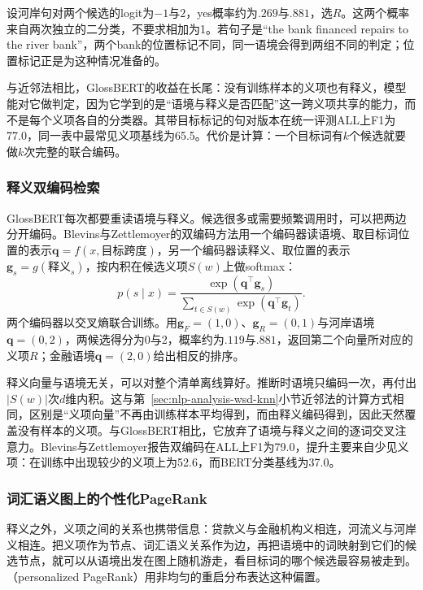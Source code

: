 设河岸句对两个候选的logit为$-1$与$2$，yes概率约为$.269$与$.881$，选$R$。这两个概率来自两次独立的二分类，不要求相加为1。若句子是“the bank financed repairs to the river bank”，两个bank的位置标记不同，同一语境会得到两组不同的判定；位置标记正是为这种情况准备的。

与近邻法相比，GlossBERT的收益在长尾：没有训练样本的义项也有释义，模型能对它做判定，因为它学到的是“语境与释义是否匹配”这一跨义项共享的能力，而不是每个义项各自的分类器。其带目标标记的句对版本在统一评测ALL上F1为77.0，同一表中最常见义项基线为65.5。代价是计算：一个目标词有$k$个候选就要做$k$次完整的联合编码。

\subsubsection{释义双编码检索}
\label{sec:nlp-analysis-gloss-retrieval}

GlossBERT每次都要重读语境与释义。候选很多或需要频繁调用时，可以把两边分开编码。Blevins与Zettlemoyer的双编码方法用一个编码器读语境、取目标词位置的表示$\bm q=f(x,\text{目标跨度})$，另一个编码器读释义、取\code{[CLS]}位置的表示$\bm g_s=g(\text{释义}_s)$，按内积在候选义项$S(w)$上做softmax\cite{blevins-zettlemoyer-2020-moving}：
\[
 p(s\mid x)=\frac{\exp(\bm q^{\top}\bm g_s)}
                  {\sum_{t\in S(w)}\exp(\bm q^{\top}\bm g_t)}.
\]
两个编码器以交叉熵联合训练。用$\bm g_F=(1,0)$、$\bm g_R=(0,1)$与河岸语境$\bm q=(0,2)$，两候选得分为0与2，概率约为$.119$与$.881$，返回第二个向量所对应的义项$R$；金融语境$\bm q=(2,0)$给出相反的排序。

释义向量与语境无关，可以对整个清单离线算好。推断时语境只编码一次，再付出$|S(w)|$次$d$维内积。这与第~\ref{sec:nlp-analysis-wsd-knn}小节近邻法的计算方式相同，区别是“义项向量”不再由训练样本平均得到，而由释义编码得到，因此天然覆盖没有样本的义项。与GlossBERT相比，它放弃了语境与释义之间的逐词交叉注意力。Blevins与Zettlemoyer报告双编码在ALL上F1为79.0，提升主要来自少见义项：在训练中出现较少的义项上为52.6，而BERT分类基线为37.0。

\subsubsection{词汇语义图上的个性化PageRank}
\label{sec:nlp-analysis-wsd-ppr}

释义之外，义项之间的关系也携带信息：贷款义与金融机构义相连，河流义与河岸义相连。把义项作为节点、词汇语义关系作为边，再把语境中的词映射到它们的候选节点，就可以从语境出发在图上随机游走，看目标词的哪个候选最容易被走到。（personalized PageRank）用非均匀的重启分布表达这种偏置。

